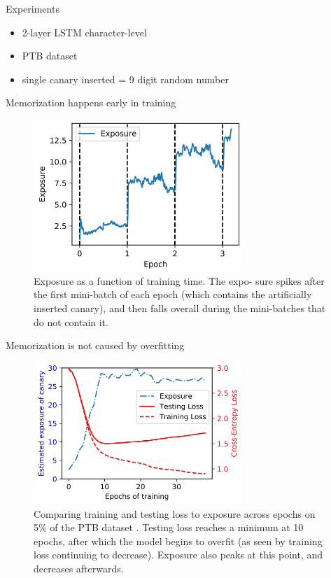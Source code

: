 \documentclass{beamer}
\begin{document}
\begin{frame}{Experiments}

\begin{itemize}
\item 2-layer LSTM character-level 
\item PTB dataset 
\item single canary inserted  = 9 digit random number
\end{itemize}

\end{frame}
\begin{frame}{Memorization happens early in training}

\begin{figure}[h]
\includegraphics[width=0.7\textwidth]{img/early}
\caption{Exposure as a function of training time. The expo- sure spikes after the first mini-batch of each epoch (which contains the artificially inserted canary), and then falls overall during the mini-batches that do not contain it.}
\end{figure}

\end{frame}
\begin{frame}{Memorization is not caused by overfitting}

\begin{figure}[h]
\includegraphics[width=0.7\textwidth]{img/overfit}
\caption{Comparing training and testing loss to exposure across epochs on 5\% of the PTB dataset . Testing loss reaches a minimum at 10 epochs, after which the model begins to overfit (as seen by training loss continuing to decrease). Exposure also peaks at this point, and decreases afterwards.}
\end{figure}

\end{frame}
\end{document}
